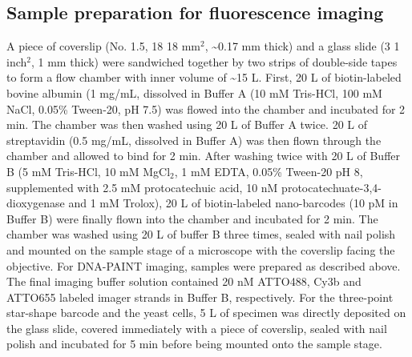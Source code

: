 \subsection{Sample preparation for fluorescence imaging}
A piece of coverslip (No. 1.5, 18  18 mm$^2$, \textasciitilde0.17 mm thick) and a glass slide (3  1 inch$^2$, 1 mm thick) were sandwiched together by two strips of double-side tapes to form a flow chamber with inner volume of \textasciitilde15 \textmu L. First, 20 \textmu L of biotin-labeled bovine albumin (1 mg/mL, dissolved in Buffer A (10 mM Tris-HCl, 100 mM NaCl, 0.05\% Tween-20, pH 7.5) was flowed into the chamber and incubated for 2 min. The chamber was then washed using 20 \textmu L of Buffer A twice. 20 \textmu L of streptavidin (0.5 mg/mL, dissolved in Buffer A) was then flown through the chamber and allowed to bind for 2 min. After washing twice with 20 \textmu L of Buffer B (5 mM Tris-HCl, 10 mM MgCl$_2$, 1 mM EDTA, 0.05\% Tween-20 pH 8, supplemented with 2.5 mM protocatechuic acid, 10 nM protocatechuate-3,4-dioxygenase and 1 mM Trolox), 20 \textmu L of biotin-labeled nano-barcodes (10 pM in Buffer B) were finally flown into the chamber and incubated for 2 min. The chamber was washed using 20 \textmu L of buffer B three times, sealed with nail polish and mounted on the sample stage of a microscope with the coverslip facing the objective. For DNA-PAINT imaging, samples were prepared as described above. The final imaging buffer solution contained 20 nM ATTO488, Cy3b and ATTO655 labeled imager strands in Buffer B, respectively. For the three-point star-shape barcode and the yeast cells, 5 \textmu L of specimen was directly deposited on the glass slide, covered immediately with a piece of coverslip, sealed with nail polish and incubated for 5 min before being mounted onto the sample stage. 

